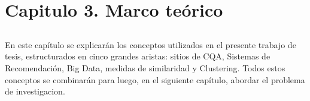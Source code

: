 \chapter*{Capitulo 3. \textbf{Marco teórico}}\label{ch:marcoteorico}

\section*{}
\addtocounter{section}{1}
\setcounter{subsection}{0}

En este capítulo se explicarán los conceptos utilizados en el presente trabajo de tesis, estructurados en cinco grandes aristas: sitios de CQA, Sistemas de Recomendación, Big Data, medidas de similaridad y Clustering. Todos estos conceptos se combinarán para luego, en el siguiente capítulo, abordar el problema de investigacion.








